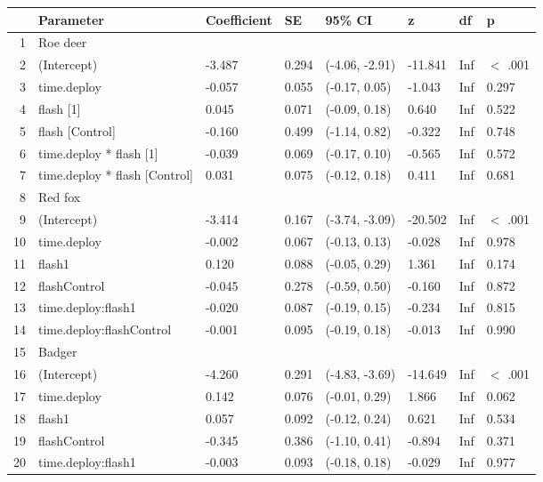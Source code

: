 \begin{table}[ht]
\centering
\begin{tabular}{rlllllll}
  \hline
 & Parameter & Coefficient & SE & 95\% CI & z & df & p \\ 
  \hline
1 & Roe deer &  &  &  &  &  &        \\ 
  2 & (Intercept) & -3.487 & 0.294 & (-4.06, -2.91) & -11.841 & Inf & $<$ .001 \\ 
  3 & time.deploy & -0.057 & 0.055 & (-0.17,  0.05) & -1.043 & Inf & 0.297  \\ 
  4 & flash [1] & 0.045 & 0.071 & (-0.09,  0.18) & 0.640 & Inf & 0.522  \\ 
  5 & flash [Control] & -0.160 & 0.499 & (-1.14,  0.82) & -0.322 & Inf & 0.748  \\ 
  6 & time.deploy * flash [1] & -0.039 & 0.069 & (-0.17,  0.10) & -0.565 & Inf & 0.572  \\ 
  7 & time.deploy * flash [Control] & 0.031 & 0.075 & (-0.12,  0.18) & 0.411 & Inf & 0.681  \\ 
  8 & Red fox &  &  &  &  &  &        \\ 
  9 & (Intercept) & -3.414 & 0.167 & (-3.74, -3.09) & -20.502 & Inf & $<$ .001 \\ 
  10 & time.deploy & -0.002 & 0.067 & (-0.13,  0.13) & -0.028 & Inf & 0.978  \\ 
  11 & flash1 & 0.120 & 0.088 & (-0.05,  0.29) & 1.361 & Inf & 0.174  \\ 
  12 & flashControl & -0.045 & 0.278 & (-0.59,  0.50) & -0.160 & Inf & 0.872  \\ 
  13 & time.deploy:flash1 & -0.020 & 0.087 & (-0.19,  0.15) & -0.234 & Inf & 0.815  \\ 
  14 & time.deploy:flashControl & -0.001 & 0.095 & (-0.19,  0.18) & -0.013 & Inf & 0.990  \\ 
  15 & Badger &  &  &  &  &  &        \\ 
  16 & (Intercept) & -4.260 & 0.291 & (-4.83, -3.69) & -14.649 & Inf & $<$ .001 \\ 
  17 & time.deploy & 0.142 & 0.076 & (-0.01,  0.29) & 1.866 & Inf & 0.062  \\ 
  18 & flash1 & 0.057 & 0.092 & (-0.12,  0.24) & 0.621 & Inf & 0.534  \\ 
  19 & flashControl & -0.345 & 0.386 & (-1.10,  0.41) & -0.894 & Inf & 0.371  \\ 
  20 & time.deploy:flash1 & -0.003 & 0.093 & (-0.18,  0.18) & -0.029 & Inf & 0.977  \\ 

\end{tabular}
\end{table}
